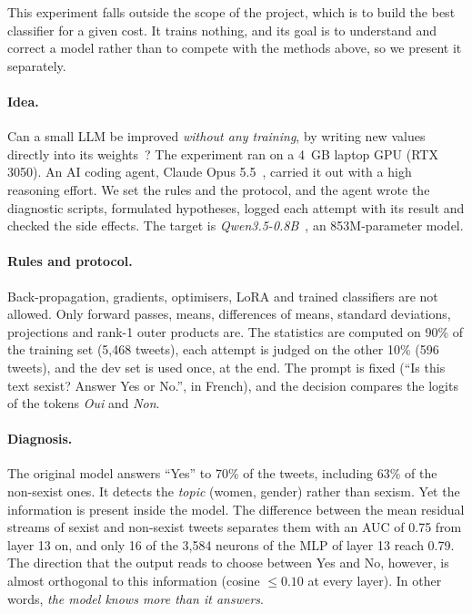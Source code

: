 \documentclass[pdflatex,sn-mathphys-num]{sn-jnl}
\begin{document}
This experiment falls outside the scope of the project, which is to build the best classifier for a given cost. It trains nothing, and its goal is to understand and correct a model rather than to compete with the methods above, so we present it separately.

\paragraph{Idea.} Can a small LLM be improved \emph{without any training}, by writing new values directly into its weights~\cite{takehi2026wsp}? The experiment ran on a 4~GB laptop GPU (RTX 3050). An AI coding agent, Claude Opus 5.5~\cite{claude_opus}, carried it out with a high reasoning effort. We set the rules and the protocol, and the agent wrote the diagnostic scripts, formulated hypotheses, logged each attempt with its result and checked the side effects. The target is \emph{Qwen3.5-0.8B}~\cite{qwen35}, an 853M-parameter model.

\paragraph{Rules and protocol.} Back-propagation, gradients, optimisers, LoRA and trained classifiers are not allowed. Only forward passes, means, differences of means, standard deviations, projections and rank-1 outer products are. The statistics are computed on 90\% of the training set (5,468 tweets), each attempt is judged on the other 10\% (596 tweets), and the dev set is used once, at the end. The prompt is fixed (``Is this text sexist? Answer Yes or No.'', in French), and the decision compares the logits of the tokens \emph{Oui} and \emph{Non}.

\paragraph{Diagnosis.} The original model answers ``Yes'' to 70\% of the tweets, including 63\% of the non-sexist ones. It detects the \emph{topic} (women, gender) rather than sexism. Yet the information is present inside the model. The difference between the mean residual streams of sexist and non-sexist tweets separates them with an AUC of 0.75 from layer 13 on, and only 16 of the 3,584 neurons of the MLP of layer 13 reach 0.79. The direction that the output reads to choose between Yes and No, however, is almost orthogonal to this information (cosine $\le 0.10$ at every layer). In other words, \emph{the model knows more than it answers}.
\end{document}
